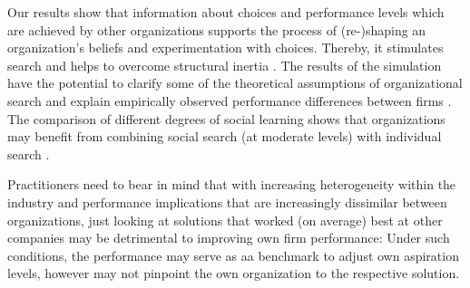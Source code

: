 Our results show that information about choices and performance levels which are achieved by other organizations supports the process of (re-)shaping an organization's beliefs and experimentation with choices. Thereby, it stimulates search and helps to overcome structural inertia \citep{hannanfreeman1984}. 
The results of the simulation have the potential to clarify some of the theoretical assumptions of organizational search and explain empirically observed performance differences between firms \citep{audiabrion2007_reluctant-to-change:-self-e, Greve1998_Performance-Aspirations-and-Risky-Organizational_ASQ, ketchen-jr.palmer1999_strategic-responses-to-poor, march1988_variable-risk-preferences-a, March1996_Learning-to-be-Risk-Averse_PsychologicalReview, MarchSimon1958_Organizations,  selten1998_aspiration-adaptation-theor, Singh1986_Performance-Slack-and-Risk-Taking_AMJ, WisemanBromiley1996_Toward-a-Model-of-Risk-in-Declining-Organizations_OS}. The comparison of different degrees of social learning shows that organizations may benefit from combining social search (at moderate levels) with individual search \citep{BinghamDavis2012_Learning-Sequences-Their-Existence-Effect-and-Evolution_AMJ}.

Practitioners need to bear in mind that with increasing heterogeneity within the industry and performance implications that are increasingly dissimilar between organizations, just looking at solutions that worked (on average) best at other companies may be detrimental to improving own firm performance: Under such conditions, the performance may serve as aa benchmark to adjust own aspiration levels, however may not pinpoint the own organization to the respective solution. 


